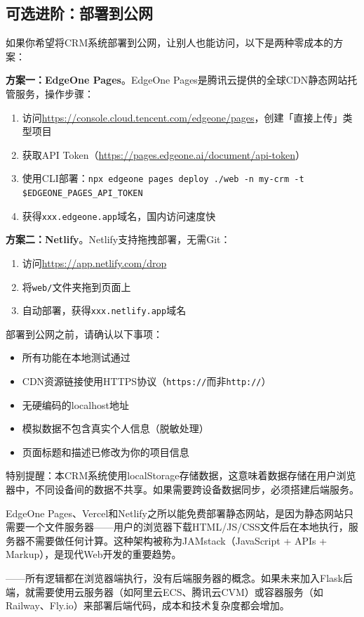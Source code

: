 \subsection{可选进阶：部署到公网}

如果你希望将CRM系统部署到公网，让别人也能访问，以下是两种零成本的方案：

\textbf{方案一：EdgeOne Pages}。EdgeOne Pages是腾讯云提供的全球CDN静态网站托管服务，操作步骤：
\begin{enumerate}[leftmargin=2em]
  \item 访问\url{https://console.cloud.tencent.com/edgeone/pages}，创建「直接上传」类型项目
  \item 获取API Token（\url{https://pages.edgeone.ai/document/api-token}）
  \item 使用CLI部署：\texttt{npx edgeone pages deploy ./web -n my-crm -t \$EDGEONE\_PAGES\_API\_TOKEN}
  \item 获得\texttt{xxx.edgeone.app}域名，国内访问速度快
\end{enumerate}

\textbf{方案二：Netlify}。Netlify支持拖拽部署，无需Git：
\begin{enumerate}[leftmargin=2em]
  \item 访问\url{https://app.netlify.com/drop}
  \item 将\texttt{web/}文件夹拖到页面上
  \item 自动部署，获得\texttt{xxx.netlify.app}域名
\end{enumerate}

\begin{warningbox}[部署前检查清单]
部署到公网之前，请确认以下事项：
\begin{itemize}[leftmargin=2em]
  \item 所有功能在本地测试通过
  \item CDN资源链接使用HTTPS协议（\texttt{https://}而非\texttt{http://}）
  \item 无硬编码的localhost地址
  \item 模拟数据不包含真实个人信息（脱敏处理）
  \item 页面标题和描述已修改为你的项目信息
\end{itemize}
特别提醒：本CRM系统使用localStorage存储数据，这意味着数据存储在用户浏览器中，不同设备间的数据不共享。如果需要跨设备数据同步，必须搭建后端服务。\end{warningbox}

\begin{theorybox}[静态网站部署的技术原理]
EdgeOne Pages、Vercel和Netlify之所以能免费部署静态网站，是因为静态网站只需要一个文件服务器——用户的浏览器下载HTML/JS/CSS文件后在本地执行，服务器不需要做任何计算。这种架构被称为JAMstack（JavaScript + APIs + Markup），是现代Web开发的重要趋势。\par\n{}——所有逻辑都在浏览器端执行，没有后端服务器的概念。如果未来加入Flask后端，就需要使用云服务器（如阿里云ECS、腾讯云CVM）或容器服务（如Railway、Fly.io）来部署后端代码，成本和技术复杂度都会增加。\end{theorybox}

